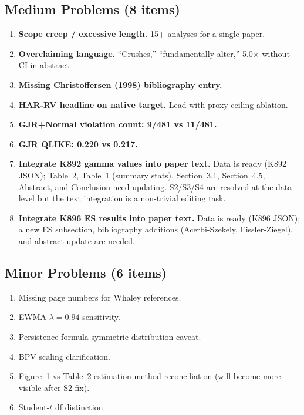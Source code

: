 \documentclass[12pt,a4paper]{article}
\begin{document}
\subsection*{\textcolor{warncolor}{Medium Problems (8 items)}}

\begin{enumerate}[label=\textcolor{warncolor}{M\arabic*}]

\item \textbf{Scope creep / excessive length.} 15+ analyses for a single paper.

\item \textbf{Overclaiming language.} ``Crushes,'' ``fundamentally alter,'' 5.0$\times$ without CI in abstract.

\item \textbf{Missing Christoffersen (1998) bibliography entry.}

\item \textbf{HAR-RV headline on native target.} Lead with proxy-ceiling ablation.

\item \textbf{GJR+Normal violation count: 9/481 vs 11/481.}

\item \textbf{GJR QLIKE: 0.220 vs 0.217.}

\item \textbf{Integrate K892 gamma values into paper text.} Data is ready (K892 JSON); Table~2, Table~1 (summary stats), Section~3.1, Section~4.5, Abstract, and Conclusion need updating. S2/S3/S4 are resolved at the data level but the text integration is a non-trivial editing task.

\item \textbf{Integrate K896 ES results into paper text.} Data is ready (K896 JSON); a new ES subsection, bibliography additions (Acerbi-Szekely, Fissler-Ziegel), and abstract update are needed.

\end{enumerate}

\subsection*{Minor Problems (6 items)}

\begin{enumerate}[label=m\arabic*]
\item Missing page numbers for Whaley references.
\item EWMA $\lambda = 0.94$ sensitivity.
\item Persistence formula symmetric-distribution caveat.
\item BPV scaling clarification.
\item Figure~1 vs Table~2 estimation method reconciliation (will become more visible after S2 fix).
\item Student-$t$ df distinction.
\end{enumerate}
\end{document}
